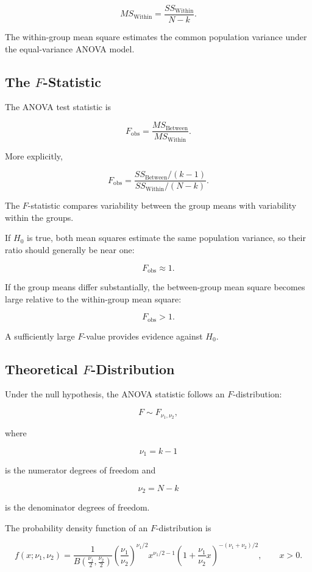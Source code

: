 \documentclass[11pt]{article}
\begin{document}
\[
\boxed{
MS_{\mathrm{Within}}
=
\frac{
SS_{\mathrm{Within}}
}{
N-k
}.
}
\]

The within-group mean square estimates the common population variance
under the equal-variance ANOVA model.

\subsection{The \(F\)-Statistic}

The ANOVA test statistic is

\[
\boxed{
F_{\mathrm{obs}}
=
\frac{
MS_{\mathrm{Between}}
}{
MS_{\mathrm{Within}}
}.
}
\]

More explicitly,

\[
\boxed{
F_{\mathrm{obs}}
=
\frac{
SS_{\mathrm{Between}}/(k-1)
}{
SS_{\mathrm{Within}}/(N-k)
}.
}
\]

The \(F\)-statistic compares variability between the group means with
variability within the groups.

If \(H_0\) is true, both mean squares estimate the same population
variance, so their ratio should generally be near one:

\[
F_{\mathrm{obs}}\approx1.
\]

If the group means differ substantially, the between-group mean square
becomes large relative to the within-group mean square:

\[
F_{\mathrm{obs}}>1.
\]

A sufficiently large \(F\)-value provides evidence against \(H_0\).

\subsection{Theoretical \(F\)-Distribution}

Under the null hypothesis, the ANOVA statistic follows an
\(F\)-distribution:

\[
F\sim F_{\nu_1,\nu_2},
\]

where

\[
\nu_1=k-1
\]

is the numerator degrees of freedom and

\[
\nu_2=N-k
\]

is the denominator degrees of freedom.

The probability density function of an \(F\)-distribution is

\[
f(x;\nu_1,\nu_2)
=
\frac{
1
}{
B\left(\frac{\nu_1}{2},\frac{\nu_2}{2}\right)
}
\left(
\frac{\nu_1}{\nu_2}
\right)^{\nu_1/2}
x^{\nu_1/2-1}
\left(
1+\frac{\nu_1}{\nu_2}x
\right)^{-(\nu_1+\nu_2)/2},
\qquad x>0.
\]
\end{document}
